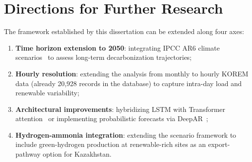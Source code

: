 \section{Directions for Further Research}
\label{sec:disc_future}

The framework established by this dissertation can be extended along four axes:
\begin{enumerate}
    \item \textbf{Time horizon extension to 2050}: integrating IPCC AR6 climate scenarios~\cite{ipcc2022, rogelj2018} to assess long-term decarbonization trajectories;
    \item \textbf{Hourly resolution}: extending the analysis from monthly to hourly KOREM data (already 20{,}928 records in the database) to capture intra-day load and renewable variability;
    \item \textbf{Architectural improvements}: hybridizing LSTM with Transformer attention~\cite{lim2021} or implementing probabilistic forecasts via DeepAR~\cite{salinas2020};
    \item \textbf{Hydrogen-ammonia integration}: extending the scenario framework to include green-hydrogen production at renewable-rich sites as an export-pathway option for Kazakhstan.
\end{enumerate}
